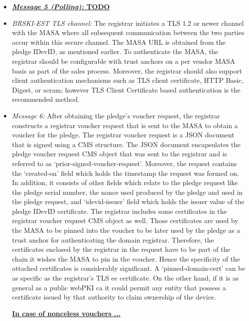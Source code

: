 \begin{itemize}
	\item \textbf{\underline{\textit{Message 5 (Polling):} TODO}}
	
	\item \textit{BRSKI-EST TLS channel:} The registrar initiates a TLS 1.2 or newer channel with the MASA where all subsequent communication between the two parties occur within this secure channel. The MASA URL is obtained from the pledge IDevID, as mentioned earlier. To authenticate the MASA, the registrar should be configurable with trust anchors on a per vendor MASA basis as part of the sales process. Moreover, the registrar should also support client authentication mechanisms such as TLS client certificate, HTTP Basic, Digest, or \gls{scram}; however TLS Client Certificate based authentication is the recommended method.
	
	\item \textit{Message 6:} After obtaining the pledge's voucher request, the registrar constructs a registrar voucher request that is sent to the MASA to obtain a voucher for the pledge. The registrar voucher request is a JSON document that is signed using a CMS structure. The JSON document encapsulates the pledge voucher request CMS object that was sent to the registrar and is referred to as `prior-signed-voucher-request'. Moreover, the request contains the `created-on' field which holds the timestamp the request was formed on. In addition, it consists of other fields which relate to the pledge request like the pledge serial number, the nonce used produced by the pledge and used in the pledge request, and `idevid-issuer' field which holds the issuer value of the pledge IDevID certificate. The registrar includes some certificates in the registrar voucher request CMS object as well. Those certificates are used by the MASA to be pinned into the voucher to be later used by the pledge as a trust anchor for authenticating the domain registrar. Therefore, the certificates enclosed by the registrar in the request have to be part of the chain it wishes the MASA to pin in the voucher. Hence the specificity of the attached certificates is considerably significant. A `pinned-domain-cert' can be as specific as the registrar's TLS \gls{ee} certificate. On the other hand, if it is as general as a public webPKI \gls{ca} it could permit any entity that possess a certificate issued by that authority to claim ownership of the device.
	\par
	
	\textbf{\underline{	In case of nonceless vouchers ...}}
	

\end{itemize}
